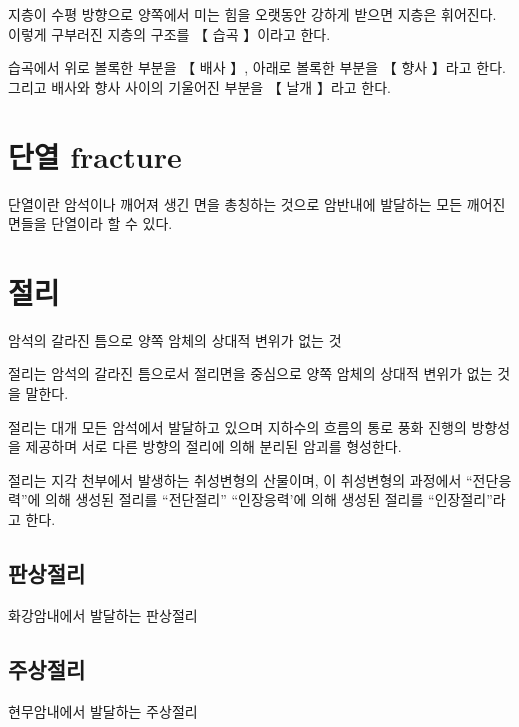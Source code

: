 \documentclass[12pt, a4paper, oneside]{book}
\begin{document}
지층이 수평 방향으로 양쪽에서 미는 힘을 오랫동안 강하게 받으면 지층은 휘어진다. 이렇게 구부러진 지층의 구조를 【 습곡 】이라고 한다.

습곡에서 위로 볼록한 부분을 【 배사 】, 아래로 볼록한 부분을 【 향사 】라고 한다. 그리고 배사와 향사 사이의 기울어진 부분을 【 날개 】라고 한다.





	\newpage  \null
	\section{단열 fracture}
	단열이란 암석이나 깨어져 생긴 면을 총칭하는 것으로 암반내에 발달하는 모든 깨어진 면들을 단열이라 할 수 있다.



	\newpage  \null
	\section{절리}


	암석의 갈라진 틈으로 양쪽 암체의 상대적 변위가 없는 것

	절리는 암석의 갈라진 틈으로서 절리면을 중심으로 양쪽 암체의 상대적 변위가 없는 것을 말한다.

	절리는 대개 모든 암석에서 발달하고 있으며
지하수의 흐름의 통로
풍화 진행의 방향성을 제공하며
서로 다른 방향의 절리에 의해 분리된 암괴를 형성한다.

절리는 지각 천부에서 발생하는 취성변형의 산물이며, 이 취성변형의 과정에서 ``전단응력''에 의해 생성된 절리를 ``전단절리'' ``인장응력'에 의해 생성된 절리를 ``인장절리''라고 한다.



	\subsection{판상절리}
화강암내에서 발달하는 판상절리

	\subsection{주상절리}
현무암내에서 발달하는 주상절리
\end{document}
